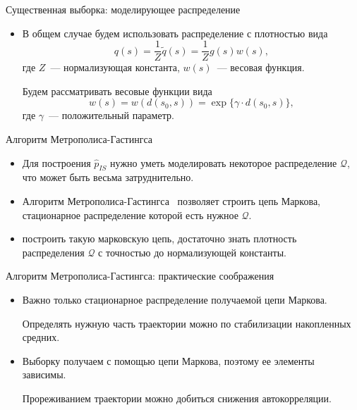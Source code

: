 \documentclass[pdf, 10pt, unicode]{beamer}
\begin{document}
\begin{frame}{Существенная выборка: моделирующее распределение}

\begin{itemize}
    \item В общем случае будем использовать распределение с плотностью вида 
    \begin{equation*}
        q(s) = \frac{1}{Z} \tilde{q}(s) = \frac{1}{Z}g(s)w(s), 
    \end{equation*}
    где $Z$~--- нормализующая константа, $w(s)$~--- весовая функция. 
    
    Будем рассматривать весовые функции вида 
    \begin{equation*}
        w(s) = w(d(s_0, s)) = \exp\{\gamma\cdot d(s_0,s)\}, 
    \end{equation*}
    где $\gamma$~--- положительный параметр. 
    \end{itemize}
\end{frame}

\begin{frame}{Алгоритм Метрополиса-Гастингса}


\begin{itemize}

\item {\large Для построения $\hat{p}_{IS}$ нужно уметь моделировать некоторое распределение $\mathcal{Q}$, что может быть весьма затруднительно.} 


\item {\large Алгоритм Метрополиса-Гастингса~\parencite{Hastings_1970} позволяет строить цепь Маркова, стационарное распределение которой есть нужное $\mathcal{Q}$.}

\item { построить такую марковскую цепь, достаточно знать плотность распределения $\mathcal{Q}$ с точностью до нормализующей константы.} 
\end{itemize}


\end{frame}

\begin{frame}{Алгоритм Метрополиса-Гастингса: практические соображения}
\begin{itemize}
    \item Важно только стационарное распределение получаемой цепи Маркова.
    
    Определять нужную часть траектории можно по стабилизации накопленных средних.
    \item Выборку получаем с помощью цепи Маркова, поэтому ее элементы зависимы. 
    
    Прореживанием траектории можно добиться снижения автокорреляции. 
\end{itemize}


    
\end{frame}
\end{document}

